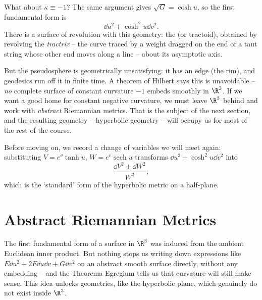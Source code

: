 What about $\kappa \equiv -1$? The same argument gives $\sqrt{G} = \cosh u$, so the first fundamental form is
$$
\dd u^2 + \cosh^2 u \dd v^2.
$$
There is a surface of revolution with this geometry: the  (or tractoid), obtained by revolving the \emph{tractrix} -- the curve traced by a weight dragged on the end of a taut string whose other end moves along a line -- about its asymptotic axis.
\begin{center}
\end{center}
But the pseudosphere is geometrically unsatisfying: it has an edge (the rim), and geodesics run off it in finite time. A theorem of Hilbert says this is unavoidable -- \emph{no} complete surface of constant curvature $-1$ embeds smoothly in $\R^3$. If we want a good home for constant negative curvature, we must leave $\R^3$ behind and work with \emph{abstract} Riemannian metrics. That is the subject of the next section, and the resulting geometry -- hyperbolic geometry -- will occupy us for most of the rest of the course.

Before moving on, we record a change of variables we will meet again: substituting $V = e^{v}\tanh u$, $W = e^{v}\operatorname{sech} u$ transforms $\dd u^2 + \cosh^2 u \dd v^2$ into
$$
\frac{\dd V^2 + \dd W^2}{W^2},
$$
which is the `standard' form of the hyperbolic metric on a half-plane.

\section{Abstract Riemannian Metrics}\label{sec:riemannianmetrics}

The first fundamental form of a surface in $\R^3$ was induced from the ambient Euclidean inner product. But nothing stops us writing down expressions like $E \dd u^2 + 2F \dd u \dd v + G \dd v^2$ on an abstract smooth surface directly, without any embedding -- and the Theorema Egregium tells us that curvature will still make sense. This idea unlocks geometries, like the hyperbolic plane, which genuinely do not exist inside $\R^3$.

